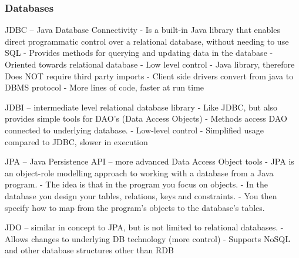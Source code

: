 \documentclass[10pt,a4paper]{article}
\begin{document}
\begin{multicols}{3}
\subsubsection{Databases}\label{databases}

JDBC -- Java Database Connectivity - Is a built-in Java library that
enables direct programmatic control over a relational database, without
needing to use SQL - Provides methods for querying and updating data in
the database - Oriented towards relational database - Low level control
- Java library, therefore Does NOT require third party imports - Client
side drivers convert from java to DBMS protocol - More lines of code,
faster at run time

JDBI -- intermediate level relational database library - Like JDBC, but
also provides simple tools for DAO's (Data Access Objects) - Methods
access DAO connected to underlying database. - Low-level control -
Simplified usage compared to JDBC, slower in execution

JPA -- Java Persistence API -- more advanced Data Access Object tools -
JPA is an object-role modelling approach to working with a database from
a Java program. - The idea is that in the program you focus on objects.
- In the database you design your tables, relations, keys and
constraints. - You then specify how to map from the program's objects to
the database's tables.

JDO -- similar in concept to JPA, but is not limited to relational
databases. - Allows changes to underlying DB technology (more control) -
Supports NoSQL and other database structures other than RDB



   	\end{multicols}
\end{document}
